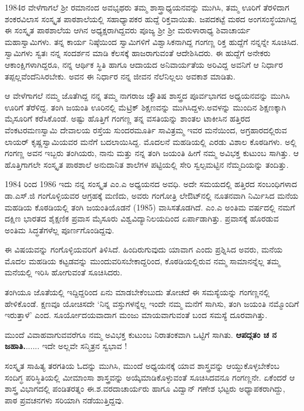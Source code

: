 {1984ರ ವೇಳೆಗಾಗಲೆ ಶ್ರೀ ರಮಾನಂದ ಅವಭೃಥರು ತಮ್ಮ ಶಾಸ್ತ್ರಾಧ್ಯಯನವನ್ನು ಮುಗಿಸಿ, ತಮ್ಮ ಊರಿಗೆ ತೆರಳಿದಾಗ ಶಂಕರವಿಲಾಸ ಸಂಸ್ಕೃತ ಪಾಠಶಾಲೆಯಲ್ಲಿ ಸಹಾಧ್ಯಾಪಕರ ಹುದ್ದೆ ರಿಕ್ತವಾಯಿತು. ಜಪದಕಟ್ಟೆ ಮಠದ ಅಂಗಸಂಸ್ಥೆಯಾಗಿದ್ದ ಈ ಸಂಸ್ಕೃತ ಪಾಠಶಾಲೆಯ ಆಗಿನ ಅಧ್ಯಕ್ಷರಾಗಿದ್ದವರು ಪೂಜ್ಯ ಶ್ರೀ ಶ್ರೀ ಮರುಳಾರಾಧ್ಯ ಶಿವಾಚಾರ್ಯ ಮಹಾಸ್ವಾಮಿಗಳು. ತನ್ನ ಕಾರ್ಯ ನಿಷ್ಠೆಯಿಂದ ಸ್ವಾಮಿಗಳಿಗೆ ವಿಶ್ವಾಸಿಕನಾಗಿದ್ದ ಗಂಗಣ್ಣ ರಿಕ್ತ ಹುದ್ದೆಗೆ ನನ್ನನ್ನೇ ಸೂಚಿಸಿದ. ಸ್ವಾಮಿಗಳು ಸ್ವತಃ ನನ್ನ ಸಂದರ್ಶನ ಮಾಡಿ ಕೆಲಸಕ್ಕೆ ಹಾಜರಾಗುವಂತೆ ಆದೇಶಿಸಿದರು. ಈ ಹುದ್ದೆಗೆ ಅನೇಕರು ಆಕಾಂಕ್ಷಿಗಳಾಗಿದ್ದರೂ, ನನ್ನ ಆರ್ಥಿಕ ಸ್ಥಿತಿ ಹಾಗೂ ಆದಾಯದ ಅನಿವಾರ್ಯತೆಯ ಅರಿವಿದ್ದ ಅವನಿಗೆ ಆ ನಿರ್ಧಾರ ತಪ್ಪಲ್ಲವೆಂದೆನಿಸಿರಬೇಕು. ಅವನ ಈ ನಿರ್ಧಾರ ನನ್ನ ಜೀವನ ನೆಲೆನಿಲ್ಲಲು ಅವಕಾಶ ಮಾಡಿತು.
\vskip 3pt

ಆ ವೇಳೆಗಾಗಲೆ ನಮ್ಮ ಜೊತೆಗಿದ್ದ ನನ್ನ ತಮ್ಮ ನಾಗರಾಜ ಜ್ಯೌತಿಷ ಶಾಸ್ತ್ರದ ಪೂರ್ವಭಾಗದ ಅಧ್ಯಯನವನ್ನು ಮುಗಿಸಿ ಊರಿಗೆ ತೆರೆಳಿದ್ದ. ತಂಗಿ ಜಯಂತಿ ಊರಿನಲ್ಲಿ ಮೆಟ್ರಿಕ್ ಶಿಕ್ಷಣವನ್ನು ಮುಗಿಸಿದ್ದಳು.ಅವಳನ್ನು ಮುಂದಿನ ಶಿಕ್ಷಣಕ್ಕಾಗಿ ಮೈಸೂರಿಗೆ ಕರೆಸಿಕೊಂಡೆ. ಅಷ್ಟು ಹೊತ್ತಿಗೆ ಗಂಗಣ್ಣ ತನ್ನ ವಸತಿಯನ್ನು ಶಾಂತಲ ಟಾಕೀಸಿನ ಹತ್ತಿರದ ವೆಂಕಟ\-ರಮಣಸ್ವಾಮಿ ದೇವಾಲಯ ರಸ್ತೆಯ ಸುಂದರಮೂರ್ತಿ  \enginline{-}  ಸಾವಿತ್ರಮ್ಮ ಇವರ ಮನೆಯಿಂದ, ಅಗ್ರಹಾರದಲ್ಲಿರುವ ಲಾಯರ್ ಕೃಷ್ಣಸ್ವಾಮಿಯವರ ಮನೆಗೆ ಬದಲಾಯಿಸಿದ್ದ. ಮೊದಲನೆ ಮಹಡಿಯಲ್ಲಿ ಎರಡು ವಿಶಾಲ ಕೊಠಡಿಗಳು. ಅಲ್ಲಿ ಗಂಗಣ್ಣ ಅವನ ಇಬ್ಬರು ತಂಗಿಯರು, ನಾನು ಮತ್ತು ನನ್ನ ತಂಗಿ ಜಯಂತಿ ಹೀಗೆ ನಮ್ಮ \hbox{ಅವಿಭಕ್ತ} ಕುಟುಂಬ ಸಾಗಿತ್ತು. ಆ ಹೊತ್ತಿಗಾಗಲೇ ಸಂಸ್ಕೃತ ಪಾಠಶಾಲೆ ಅನುದಾನಿತ ಶಾಲೆಗಳ ಪಟ್ಟಿಯಲ್ಲಿ ಸೇರಿ ಸ್ವಲ್ಪಮಟ್ಟಿನ ನೆಮ್ಮದಿಯನ್ನು ತಂದಿತ್ತು.

1984 ರಿಂದ 1986   \enginline{-}   ಇದು ನನ್ನ ಸಂಸ್ಕೃತ ಎಂ.ಎ ಅಧ್ಯಯನದ ಅವಧಿ. ಅದೇ ಸಮಯದಲ್ಲಿ ಹತ್ತಿರದ ಸಂಬಂಧಿಗಳಾದ ಡಾ.ಎಸ್.ಜಿ ಗಂಗೊಳ್ಳಿಯವರ ಆಗ್ರಹಕ್ಕೆ ಮಣಿದು, ಅವರು ಗಂಗೋತ್ರಿ ಲೇಔಟ್‍ನಲ್ಲಿ ನೂತನವಾಗಿ ನಿರ್ಮಿಸಿದ ಮನೆಯ ಮಹಡಿಯ ಕೊಠಡಿ\-ಯಲ್ಲಿ ತಂಗಿ ಜಯಂತಿಯೊಡನೆ (1985) ವಾಸಿಸತೊಡಗಿದೆ. ಎಂ.ಎ ಅಂತಿಮ ವರ್ಷದಲ್ಲಿ ನಮಗೆ ದಕ್ಷಿಣ  ಭಾರತದ ಶೈಕ್ಷಣಿಕ ಪ್ರವಾಸ ಮೈಸೂರು ವಿಶ್ವವಿದ್ಯಾನಿಲಯದಿಂದ ಏರ್ಪಾಡಾಗಿತ್ತು. ಪ್ರವಾಸಕ್ಕೆ ಹೊರಡುವ ಅಂತಿಮ ಸಿದ್ಧತೆಗಳೆಲ್ಲ \hbox{ಪೂರ್ಣಗೊಂಡಿದ್ದವು.}

ಈ ವಿಷಯವನ್ನು ಗಂಗೊಳ್ಳಿಯವರಿಗೆ ತಿಳಿಸಿದೆ.  ಹಿಂದಿರುಗುವುದು ಯಾವಾಗ ಎಂದು ಪ್ರಶ್ನಿಸಿದ ಅವರು, ಮನೆಯ ಮೊದಲ ಮಹಡಿಯ ಕಟ್ಟಡವನ್ನು ಮುಂದುವರಿಸಬೇಕಾದ್ದರಿಂದ, ಕೊಠಡಿಯಲ್ಲಿರುವ ನಮ್ಮ ಸಾಮಾನನ್ನೆಲ್ಲ ತಮ್ಮ ಮನೆಯಲ್ಲಿ ಇರಿಸಿ ಹೋಗುವಂತೆ ಸೂಚಿಸಿದರು. 

ತಂಗಿಯೂ ಜೊತೆಯಲ್ಲಿ ಇದ್ದಿದ್ದರಿಂದ ಏನು ಮಾಡಬೇಕೆಂಬುದು ತೋಚದೆ ಈ ಸಮಸ್ಯೆಯನ್ನು ಗಂಗಣ್ಣನಲ್ಲಿ ಹೇಳಿಕೊಂಡೆ. ಕ್ಷಣವೂ ಯೋಚಿಸದೇ ‘ನಿನ್ನ ವಸ್ತುಗಳನ್ನೆಲ್ಲ ಇಂದೇ ನಮ್ಮ ಮನೆಗೆ ಸಾಗಿಸು, ತಂಗಿ ಜಯಂತಿ ನಮ್ಮೊಂದಿಗೆ ಇರುತ್ತಾಳೆ’ ಎಂದ. ಸೂರ್ಯೋದಯವಾದಾಗ ಮಂಜು ಮಾಯವಾಗುವಂತೆ ಬಂದ ಸಮಸ್ಯೆ \hbox{ದೂರವಾಗಿತ್ತು.}

ಮುಂದೆ ವಿವಾಹವಾಗುವವರೆಗೂ ನಮ್ಮ ಅವಿಭಕ್ತ ಕುಟುಂಬ ನಿರಾತಂಕವಾಗಿ ಒಟ್ಟಿಗೆ ಸಾಗಿತು. \textbf{ಆಪದ್ಗತಂ ಚ ನ ಜಹಾತಿ.}...... ಇದೇ ಅಲ್ಲವೇ ಸನ್ಮಿತ್ರನ ಸ್ವಭಾವ ! 

ಸಂಸ್ಕೃತ ಸಾಹಿತ್ಯ ತರಗತಿಯ ಓದನ್ನು ಮುಗಿಸಿ, ಮುಂದೆ ಅಧ್ಯಯನಕ್ಕೆ ಯಾವ ಶಾಸ್ತ್ರವನ್ನು ಆಯ್ದುಕೊಳ್ಳಬೇಕೆಂಬ ಸಂದಿಗ್ಧ ಪರಿಸ್ಥಿತಿಯಲ್ಲಿ  ಮೀಮಾಂಸಾ ಶಾಸ್ತ್ರವನ್ನು  ಅಯ್ಕೆಮಾಡಿಕೊಳ್ಳುವಂತೆ ಸೂಚಿಸಿದವನೂ ಗಂಗಣ್ಣನೇ. ಏಕೆಂದರೆ ಆ ಶಾಸ್ತ್ರ ವಿಭಾಗ\-ದಲ್ಲಿ ಪಂಡಿತರತ್ನಂ ಈ.ಶ.ವರದಾಚಾರ್ಯರು ಹಾಗೂ ವಿದ್ವಾನ್ ಗಣೇಶ ಭಟ್ಟರು ಅಧ್ಯಾಪಕರಾಗಿದ್ದು, ಪಾಠ ಪ್ರವಚನಗಳು ಸರಿಯಾಗಿ ನಡೆಯುತ್ತಿದ್ದವು.

}
